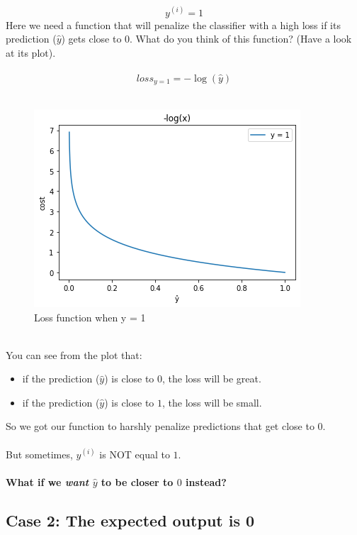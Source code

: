 $$
y^{(i)} = 1
$$  
Here we need a function that will penalize the classifier with a high loss if its prediction ($\hat{y}$) gets close to $0$.
What do you think of this function? (Have a look at its plot).\\
\\
$$
loss_{y=1} = -\log(\hat{y})
$$
\\
\begin{figure}[!h]
    \centering
    \includegraphics[scale=0.55]{assets/-log_x.png}
    \caption{Loss function when y = 1}
\end{figure}
\newline
\\
You can see from the plot that:

\begin{itemize}
    \item if the prediction ($\hat{y}$) is close to $0$, the loss will be great.
    \item if the prediction ($\hat{y}$) is close to $1$, the loss will be small.
\end{itemize}
So we got our function to harshly penalize predictions that get close to $0$.\\
\\
But sometimes, $y^{(i)}$ is NOT equal to $1$.\\
\\
\textbf{What if we \textit{want} $\hat{y}$ to be closer to $0$ instead?}\\

\newpage

\subsection*{Case 2: The expected output is 0}

